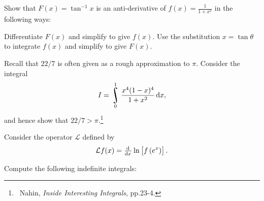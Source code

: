 \begin{questions}
\begin{multicols}{3}
    \end{multicols}
  \question
    \begin{parts}
      \parS Show that $ F(x) = \tan^{-1} x $ is an anti-derivative of $ f(x) = \frac{1}{1 + x^2} $ in the following ways:
        \begin{subparts}
          \subpart Differentiate $ F(x) $ and simplify to give $ f(x) $.
          \subpart Use the substitution $ x = \tan \theta $ to integrate $ f(x) $ and simplify to give $ F(x) $.
        \end{subparts}
      \parO Recall that $ 22/7 $ is often given as a rough approximation to $ \pi $. Consider the integral
            \begin{displaymath}
              I = \rint^1_0 \frac{x^4(1-x)^4}{1 + x^2} \dif{x},
            \end{displaymath}
            and hence show that $ 22/7 > \pi $.\footnote{~Nahin, \textit{Inside Interesting Integrals}, pp.23-4.}
    \end{parts}
  \questioS Consider the operator $ \mathcal{L} $ defined by
            \begin{displaymath}
              \mathcal{L} f(x) = \od{}{x} \ln\left[f\left(e^x\right)\right].
            \end{displaymath}
  \questioS Compute the following indefinite integrals:
    \begin{parts}

\end{parts}
\end{questions}
